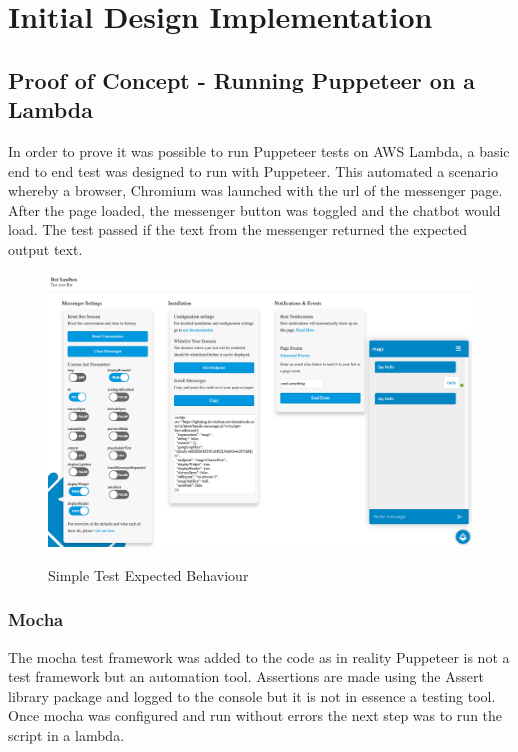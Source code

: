 \documentclass[12pt,a4paper,titlepage]{report}
\begin{document}
\chapter{Initial Design Implementation}

\section{Proof of Concept - Running Puppeteer on a Lambda}

In order to prove it was possible to run Puppeteer tests on AWS Lambda, a basic end to end test was designed
to run with Puppeteer. This automated a scenario whereby a browser, Chromium was launched with the url of the
messenger page. After the page loaded, the messenger button was toggled and the chatbot would load. The test
passed if the text from the messenger returned the expected output text.

\begin{figure}[h]
  \centering
  {\includegraphics[width=\linewidth,height=\textheight,keepaspectratio]{./diagrams/simple_test}}
  \caption{Simple Test Expected Behaviour}
\end{figure}
\newpage

\subsection{Mocha}

The mocha test framework was added to the code as in reality Puppeteer is not a test framework but an automation tool.
Assertions are made using the Assert library package and logged to the console but it is not in essence a testing tool.
Once mocha was configured and run without errors the next step was to run the script in a lambda.
\end{document}
